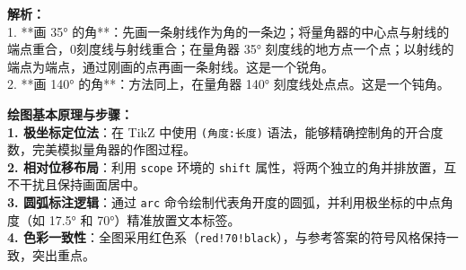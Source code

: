 \begin{center}
\end{center}

\vspace{0.8cm}

{\small\color{gray}
\textbf{解析：}\\
1. **画 35° 的角**：先画一条射线作为角的一条边；将量角器的中心点与射线的端点重合，0刻度线与射线重合；在量角器 35° 刻度线的地方点一个点；以射线的端点为端点，通过刚画的点再画一条射线。这是一个锐角。\\
2. **画 140° 的角**：方法同上，在量角器 140° 刻度线处点点。这是一个钝角。
}

\vspace{0.6cm}

{\small\color{blue!70!black}
\textbf{绘图基本原理与步骤：}\\
\textbf{1. 极坐标定位法}：在 TikZ 中使用 \texttt{(角度:长度)} 语法，能够精确控制角的开合度数，完美模拟量角器的作图过程。\\
\textbf{2. 相对位移布局}：利用 \texttt{scope} 环境的 \texttt{shift} 属性，将两个独立的角并排放置，互不干扰且保持画面居中。\\
\textbf{3. 圆弧标注逻辑}：通过 \texttt{arc} 命令绘制代表角开度的圆弧，并利用极坐标的中点角度（如 17.5° 和 70°）精准放置文本标签。\\
\textbf{4. 色彩一致性}：全图采用红色系（\texttt{red!70!black}），与参考答案的符号风格保持一致，突出重点。
}


